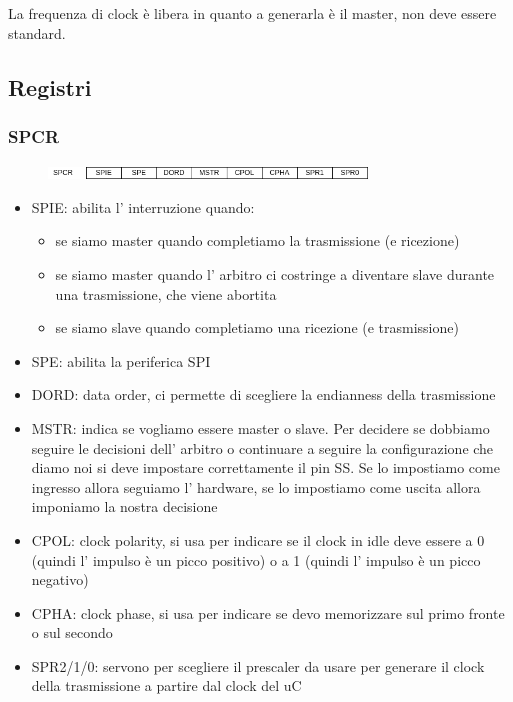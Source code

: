 {La frequenza di clock è libera in quanto a generarla è il master, non deve essere standard.

\subsection{Registri}
\subsubsection{SPCR}
\begin{figure}[H]
    \centering
    \includegraphics[width=320px]{images/23_SPI/SPCR.png}
\end{figure}
\begin{itemize}
    \item SPIE: abilita l' interruzione quando:
    \begin{itemize}
        \item se siamo master quando completiamo la trasmissione (e ricezione)
        \item se siamo master quando l' arbitro ci costringe a diventare slave durante una trasmissione, che viene abortita
        \item se siamo slave quando completiamo una ricezione (e trasmissione)
    \end{itemize}
    \item SPE: abilita la periferica SPI
    \item DORD: data order, ci permette di scegliere la endianness della trasmissione
    \item MSTR: indica se vogliamo essere master o slave.
    Per decidere se dobbiamo seguire le decisioni dell' arbitro o continuare a seguire la configurazione che diamo noi si deve impostare correttamente il pin SS.
    Se lo impostiamo come ingresso allora seguiamo l' hardware, se lo impostiamo come uscita allora imponiamo la nostra decisione
    \item CPOL: clock polarity, si usa per indicare se il clock in idle deve essere a 0 (quindi l' impulso è un picco positivo) o a 1 (quindi l' impulso è un picco negativo)
    \item CPHA: clock phase, si usa per indicare se devo memorizzare sul primo fronte o sul secondo
    \item SPR2/1/0: servono per scegliere il prescaler da usare per generare il clock della trasmissione a partire dal clock del uC 
\end{itemize}

}
